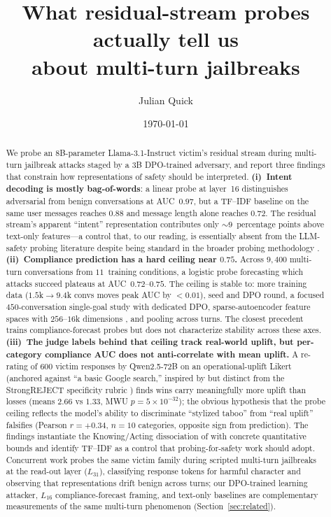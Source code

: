 \documentclass[11pt]{article}
\title{\textbf{What residual-stream probes actually tell us\\ about multi-turn jailbreaks}}
\author{Julian Quick}
\date{\today}
\begin{document}
\maketitle

\begin{abstract}
We probe an 8B-parameter Llama-3.1-Instruct victim's residual stream during multi-turn jailbreak attacks staged by a 3B DPO-trained adversary, and report three findings that constrain how representations of safety should be interpreted.
\textbf{(i)~Intent decoding is mostly bag-of-words}: a linear probe at layer~16 distinguishes adversarial from benign conversations at AUC~$0.97$, but a TF--IDF baseline on the same user messages reaches $0.88$ and message length alone reaches $0.72$.
The residual stream's apparent ``intent'' representation contributes only $\sim$$9$~percentage points above text-only features---a control that, to our reading, is essentially absent from the LLM-safety probing literature \citep{arditi2024refusal,zhang2025jbshield,jiao2026siren,qian2024hsf,goldowsky2025deception} despite being standard in the broader probing methodology \citep{hewitt2019control}.
\textbf{(ii)~Compliance prediction has a hard ceiling near $0.75$.} Across $9{,}400$ multi-turn conversations from $11$~training conditions, a logistic probe forecasting which attacks succeed plateaus at AUC~$0.72$--$0.75$.
The ceiling is stable to: more training data ($1.5$k$\to$$9.4$k convs moves peak AUC by $<0.01$), seed and DPO round, a focused $450$-conversation single-goal study with dedicated DPO, sparse-autoencoder feature spaces with $256$--$16$k dimensions \citep{karvonen2025saes}, and pooling across turns.
The closest precedent \citep{kirch2024features} trains compliance-forecast probes but does not characterize stability across these axes.
\textbf{(iii)~The judge labels behind that ceiling track real-world uplift, but per-category compliance AUC does not anti-correlate with mean uplift.} A re-rating of $600$ victim responses by Qwen2.5-72B on an operational-uplift Likert (anchored against ``a basic Google search,'' inspired by but distinct from the StrongREJECT specificity rubric \citep{souly2024strongreject}) finds wins carry meaningfully more uplift than losses (means $2.66$ vs $1.33$, MWU $p=5\times10^{-32}$); the obvious hypothesis that the probe ceiling reflects the model's ability to discriminate ``stylized taboo'' from ``real uplift'' falsifies (Pearson $r=+0.34$, $n=10$ categories, opposite sign from prediction).
The findings instantiate the Knowing/Acting dissociation of \citet{wu2026knowingwithoutacting} with concrete quantitative bounds and identify TF--IDF as a control that probing-for-safety work should adopt. Concurrent work \citep{bullwinkel2025multiturnrep} probes the same victim family during scripted multi-turn jailbreaks at the read-out layer ($L_{31}$), classifying response tokens for harmful character and observing that representations drift benign across turns; our DPO-trained learning attacker, $L_{16}$ compliance-forecast framing, and text-only baselines are complementary measurements of the same multi-turn phenomenon (Section~\ref{sec:related}).
\end{abstract}
\end{document}
